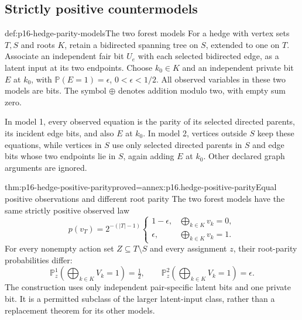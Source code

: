 \subsection{Strictly positive countermodels}

\begin{hbdefinition}{def:p16-hedge-parity-models}{The two forest models}
For a hedge with vertex sets \(T,S\) and roots \(K\), retain
a bidirected spanning tree on \(S\), extended to one on \(T\).
Associate an independent fair bit \(U_e\) with each selected
bidirected edge, as a latent input at its two endpoints. Choose
\(k_0\in K\) and an independent private bit \(E\) at \(k_0\),
with \(\mathbb P(E=1)=\epsilon\), \(0<\epsilon<1/2\).
All observed variables in these two models are bits. The symbol
\(\oplus\) denotes addition modulo two, with empty sum zero.

In model 1, every observed equation is the parity of its selected
directed parents, its incident edge bits, and also \(E\) at \(k_0\).
In model 2, vertices outside \(S\) keep these equations, while
vertices in \(S\) use only selected directed parents in \(S\)
and edge bits whose two endpoints lie in \(S\), again adding
\(E\) at \(k_0\). Other declared graph arguments are ignored.
\end{hbdefinition}

\begin{hbtheorem}{thm:p16-hedge-positive-parity}{proved=annex:p16.hedge-positive-parity}{Equal positive observations and different root parity}
The two forest models have the same strictly positive observed law
\[
 p(v_T)=2^{-(|T|-1)}
 \begin{cases}
  1-\epsilon,&\bigoplus_{k\in K}v_k=0,\\
  \epsilon,&\bigoplus_{k\in K}v_k=1.
 \end{cases}
\]
For every nonempty action set \(Z\subseteq T\setminus S\)
and every assignment \(z\), their root-parity probabilities differ:
\[
 \mathbb P^1_z\!\left(\bigoplus_{k\in K}V_k=1\right)=\tfrac12,
 \qquad
 \mathbb P^2_z\!\left(\bigoplus_{k\in K}V_k=1\right)=\epsilon.
\]
The construction uses only independent pair-specific latent bits
and one private bit. It is a permitted subclass of the larger
latent-input class, rather than a replacement theorem for its other models.
\end{hbtheorem}

